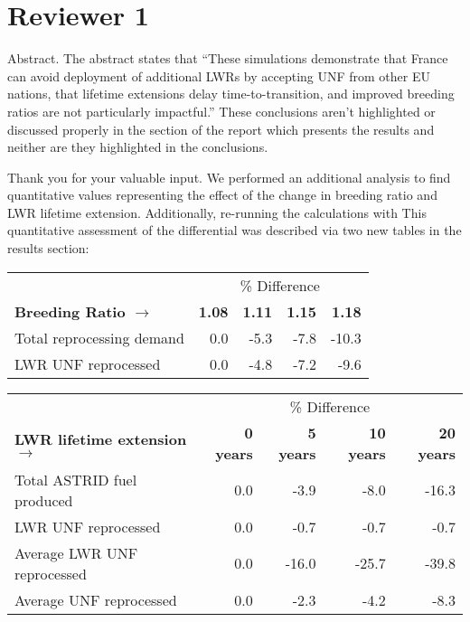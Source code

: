 \documentclass[answers,11pt]{exam}
\begin{document}
\section*{Reviewer 1}
\begin{questions}

        \question Abstract. The abstract states that ``These simulations 
        demonstrate that France can avoid deployment of additional LWRs by 
        accepting UNF from other EU nations, that lifetime extensions delay 
        time-to-transition, and improved breeding ratios are not particularly 
        impactful.'' These conclusions aren't highlighted or discussed properly 
        in the section of the report which presents the results and neither are 
        they highlighted in the conclusions.  

        \begin{solution}
        	Thank you for your valuable input. We performed an additional
        	analysis to find quantitative values representing the effect
        	of the change in breeding ratio and LWR lifetime extension.
                Additionally, re-running the calculations with 
                This quantitative assessment of the differential was described 
                via two new tables in the results section:


	\begin{tabular}{lrrrr}
		\hline
                & \multicolumn{4}{c}{\% Difference} \\
		\textbf{Breeding Ratio $\longrightarrow$}& \textbf{1.08}& \textbf{1.11} & \textbf{1.15} & \textbf{1.18} \\
		\hline
		Total reprocessing demand & 0.0 & -5.3 & -7.8 & -10.3 \\
		\gls{LWR} \gls{UNF} reprocessed & 0.0  & -4.8 & -7.2 & -9.6 \\
		\hline
	\end{tabular}


	\begin{tabular}{lrrrr}
		\hline
		& \multicolumn{4}{c}{\% Difference} \\
		\textbf{\gls{LWR} lifetime extension $\longrightarrow$}& \textbf{0 years}& \textbf{5 years} & \textbf{10 years} & \textbf{20 years} \\
		\hline
		Total \gls{ASTRID} fuel produced & 0.0 & -3.9 & -8.0 & -16.3 \\
		\gls{LWR} \gls{UNF} reprocessed & 0.0  & -0.7 & -0.7 & -0.7 \\
		Average \gls{LWR} \gls{UNF} reprocessed & 0.0 & -16.0 & -25.7 & -39.8 \\
		Average \gls{UNF} reprocessed & 0.0 & -2.3 & -4.2 & -8.3 \\
		\hline
	\end{tabular}


\end{solution}
\end{questions}
\end{document}

